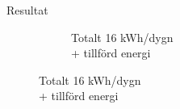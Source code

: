 \begin{frame}{Resultat}
\begin{figure}
\begin{subfigure}[b]{0.55\textwidth}
                \caption*{Totalt 16 kWh/dygn \\+ tillförd energi}
        \end{subfigure}
\end{figure}

\end{frame}
